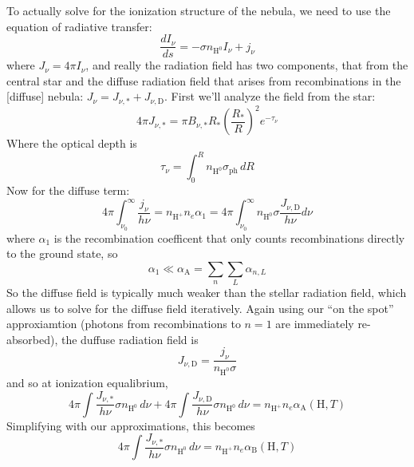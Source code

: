 \documentclass[10pt]{article}
\numberwithin{equation}{section}
\newcommand{\n}{\noindent}
\begin{document}
\n To actually solve for the ionization structure of the nebula, we need to use
the equation of radiative transfer:
\begin{equation}
  \label{eq:strom:3} \frac{dI_\nu}{ds} = -\sigma n_{\mathrm{H^0}}I_\nu + j_\nu
\end{equation}
where $J_\nu = 4\pi I_\nu$, and really the radiation field has two components,
that from the central star and the diffuse radiation field that arises from
recombinations in the [diffuse] nebula: $J_\nu = J_{\nu, *} + J_{\nu,
\mathrm{D}}$. First we'll analyze the field from the star:
\begin{equation}
  \label{eq:strom:4} 4\pi J_{\nu, *} = \pi B_{\nu, *}
   R_*\left(\frac{R_*}{R}\right)^2 e^{-\tau_\nu}
\end{equation}
Where the optical depth is
\begin{equation}
  \label{eq:strom:5} \tau_\nu = \int_0^R n_{\mathrm{H^0}}\sigma_{\mathrm{ph}}
  \,dR
\end{equation}
Now for the diffuse term:
\begin{equation}
  \label{eq:strom:6} 4\pi \int_{\nu_0}^\infty \frac{j_\nu}{h\nu} =
  n_{\mathrm{H^+}}n_e \alpha_1 = 4\pi \int_{\nu_0}^\infty n_{\mathrm{H}^0}
  \sigma \frac{J_{\nu, \mathrm{D}}}{h\nu}d\nu
\end{equation}
where $\alpha_1$ is the recombination coefficent that only counts
recombinations directly to the ground state, so
\begin{equation}
  \label{eq:strom:7} \alpha_1 \ll \alpha_{\mathrm{A}} = \sum_n\sum_L \alpha_{n,
  L}
\end{equation}
So the diffuse field is typically much weaker than the stellar radiation field,
which allows us to solve for the diffuse field iteratively. Again using our
``on the spot'' approxiamtion (photons from recombinations to $n=1$ are
immediately re-absorbed), the duffuse radiation field is
\begin{equation}
  \label{eq:strom:8} J_{\nu, \mathrm{D}} = \frac{j_\nu}{n_{\mathrm{H^0}}\sigma}
\end{equation}
and so at ionization equalibrium,
\begin{equation}
  \label{eq:strom:9} 4\pi \int \frac{J_{\nu, *}}{h\nu}\sigma n_{\mathrm{H^0}}\,
  d\nu + 4\pi \int\frac{J_{\nu,\mathrm{D}}}{h\nu}\sigma n_{\mathrm{H^0}}\,d\nu
  = n_{\mathrm{H^+}}n_e \alpha_{\mathrm{A}}(\mathrm{H},T)
\end{equation}
Simplifying with our approximations, this becomes
\begin{equation}
  \label{eq:strom:10} 4\pi \int \frac{J_{\nu, *}}{h\nu} \sigma n_{\mathrm{H^0}}
  \,d\nu = n_{\mathrm{H^+}}n_e\alpha_{\mathrm{B}}(\mathrm{H},T)
\end{equation}
\end{document}

